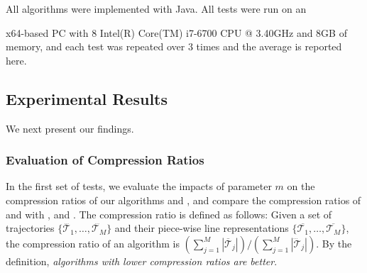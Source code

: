 All algorithms were implemented with Java.
All tests were run on an {x64-based  PC with 8 Intel(R) Core(TM) i7-6700 CPU @ 3.40GHz and 8GB of memory, and each test was repeated
over 3 times and the average is reported here.

%

\subsection{Experimental Results}

We next present our findings.

\subsubsection{Evaluation of Compression Ratios}


In the first set of tests, we evaluate the impacts of parameter $m$ on the
compression ratios of our algorithms \cist and \cista, and compare the compression ratios of \cist and \cista with \dps, \squishe and \osed.
%
The compression ratio is defined as follows: Given a set of trajectories $\{\dddot{\mathcal{T}_1}, \ldots, \dddot{\mathcal{T}_M}\}$ and their piece-wise line representations $\{\overline{\mathcal{T}_1}, \ldots, \overline{\mathcal{T}_M}\}$, the compression ratio of an algorithm is $(\sum_{j=1}^{M} |\overline{\mathcal{T}}_j |)/(\sum_{j=1}^{M} |\dddot{\mathcal{T}}_j |)$.
By the definition, \emph{algorithms with lower compression ratios are better}.







}
